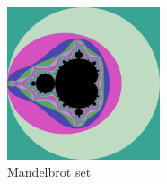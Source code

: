 \documentclass[11pt]{article}
\begin{document}
    \begin{figure}[htbp]
        \label{fig:figure}
        \centering
        \includegraphics[width=0.4\textwidth]{MandelbrotSet}
        \caption{Mandelbrot set}
    \end{figure}

    
    
\end{document}
